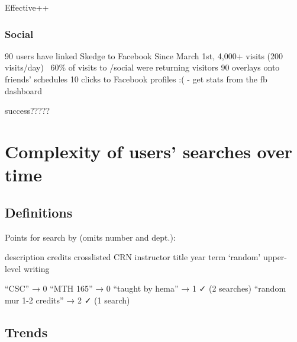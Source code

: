   Effective++

  \subsubsection{Social}

  90 users have linked Skedge to Facebook
  Since March 1st,
  4,000+ visits (200 visits/day)
  ~60\% of visits to /social were returning visitors
  90 overlays onto friends’ schedules
  10 clicks to Facebook profiles :(
  - get stats from the fb dashboard

  success?????


\section{Complexity of users' searches over time}

\subsection{Definitions}

Points for search by (omits number and dept.):

description
credits
crosslisted
CRN
instructor
title
year
term
‘random’
upper-level writing

“CSC” → 0
“MTH 165” → 0
“taught by hema” → 1   ✓    (2 searches) 
“random mur 1-2 credits” → 2   ✓    (1 search) 


\subsection{Trends}

